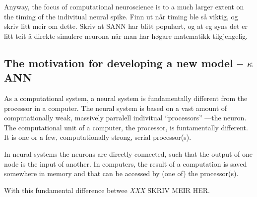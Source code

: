 Anyway, the focus of computational neuroscience is to a much larger extent on the timing of the indivitual neural spike. 
Finn ut når timing ble så viktig, og skriv litt meir om dette. Skriv at SANN har blitt populært, og at eg syns det er litt teit å direkte simulere neurona når man har høgare matematikk tilgjengelig.




\subsection{The motivation for developing a new model -- $\kappa$ANN}
As a computational system, a neural system is fundamentally different from the processor in a computer. 
The neural system is based on a vast amount of computationally weak, massively parralell indivitual ``processors'' ---the neuron. 
The computational unit of a computer, the processor, is funtamentally different. It is one or a few, computationally strong, serial processor(s). 

In neural systems the neurons are directly connected, such that the output of one node is the input of another. In computers, the result of a computation is saved somewhere in memory and that can be accessed by (one of) the processor(s).

With this fundamental difference betwee  \emph{XXX} SKRIV MEIR HER.


















